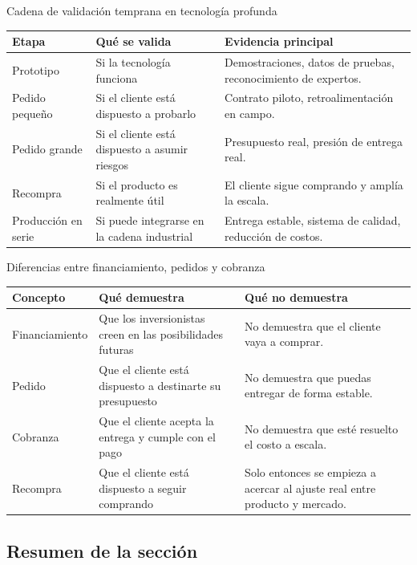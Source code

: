 \documentclass[a4paper]{article}
\begin{document}
\begin{knowledgebox}{Cadena de validación temprana en tecnología profunda}
\begin{tabularx}{\textwidth}{p{}p{}X}
\toprule
Etapa & Qué se valida & Evidencia principal \\
\midrule
Prototipo & Si la tecnología funciona & Demostraciones, datos de pruebas, reconocimiento de expertos. \\
Pedido pequeño & Si el cliente está dispuesto a probarlo & Contrato piloto, retroalimentación en campo. \\
Pedido grande & Si el cliente está dispuesto a asumir riesgos & Presupuesto real, presión de entrega real. \\
Recompra & Si el producto es realmente útil & El cliente sigue comprando y amplía la escala. \\
Producción en serie & Si puede integrarse en la cadena industrial & Entrega estable, sistema de calidad, reducción de costos. \\
\bottomrule
\end{tabularx}
\end{knowledgebox}

\begin{knowledgebox}{Diferencias entre financiamiento, pedidos y cobranza}
\begin{tabularx}{\textwidth}{p{}p{}X}
\toprule
Concepto & Qué demuestra & Qué no demuestra \\
\midrule
Financiamiento & Que los inversionistas creen en las posibilidades futuras & No demuestra que el cliente vaya a comprar. \\
Pedido & Que el cliente está dispuesto a destinarte su presupuesto & No demuestra que puedas entregar de forma estable. \\
Cobranza & Que el cliente acepta la entrega y cumple con el pago & No demuestra que esté resuelto el costo a escala. \\
Recompra & Que el cliente está dispuesto a seguir comprando & Solo entonces se empieza a acercar al ajuste real entre producto y mercado. \\
\bottomrule
\end{tabularx}
\end{knowledgebox}

\subsection{Resumen de la sección}
\end{document}
